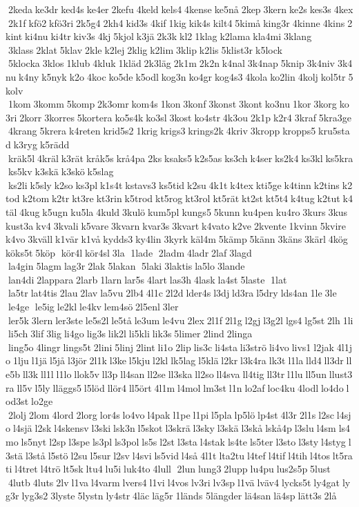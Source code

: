  2keda ke3dr ked4s ke4er 2kefu 4keld kels4 4kense ke5nå 2kep 3kern ke2s kes3s 4kex 2k1f kfö2 kfö3ri 2k5g4 2kh4 kid3s 4kif 1kig kik4s kilt4 5kimå king3r 4kinne 4kins 2kint ki4nu ki4tr kiv3s 4kj 5kjol k3jä 2k3k kl2 1klag k2lama kla4mi 3klang  3klass 2klat 5klav 2kle k2lej 2klig k2lim 3klip k2lis 5klist3r k5lock  5klocka 3klos 1klub 4kluk 1kläd 2k3läg 2k1m 2k2n k4nal 3k4nap 5knip 3k4niv 3k4nu k4ny k5nyk k2o 4koc ko5de k5odl kog3n ko4gr kog4s3 4kola ko2lin 4kolj kol5tr 5kolv  1kom 3komm 5komp 2k3omr kom4s 1kon 3konf 3konst 3kont ko3nu 1kor 3korg ko3ri 2korr 3korres 5kortera ko5s4k ko3sl 3kost ko4str 4k3ou 2k1p k2r4 3kraf 5kra3ge 4krang 5krera k4reten krid5s2 1krig krigs3 krings2k 4kriv 3kropp kropps5 kru5stad k3ryg k5rädd  kräk5l 4kräl k3rät kråk5s krå4pa 2ks ksaks5 k2s5as ks3ch k4ser ks2k4 ks3kl ks5kra ks5kv k3skä k3skö k5slag  ks2li k5sly k2so ks3pl k1s4t kstavs3 ks5tid k2su 4k1t k4tex kti5ge k4tinn k2tins k2tod k2tom k2tr kt3re kt3rin k5trod kt5rog kt3rol kt5rät kt2st kt5t4 k4tug k2tut k4täl 4kug k5ugn ku5la 4kuld 3kulö kum5pl kungs5 5kunn ku4pen ku4ro 3kurs 3kus kust3a kv4 3kvali k5vare 3kvarn kvar3s 3kvart k4vato k2ve 2kvente 1kvinn 5kvire k4vo 3kväll k1vär k1vå kydds3 ky4lin 3kyrk käl4m 5kämp 5känn 3käns 3kärl 4kög köks5t 5köp  kör4l kör4sl 3la  1lade  2ladm 4ladr 2laf 3lagd  la4gin 5lagm lag3r 2lak 5lakan  5laki 3laktis la5lo 3lande  lan4di 2lappara 2larb 1larn lar5s 4lart las3h 4lask la4st 5laste  1lat  la5tr lat4tis 2lau 2lav la5vu 2lb4 4l1c 2l2d lder4s l3dj ld3ra l5dry lds4an 1le 3le  le4ge  le5ig le2kl le4kv lem4sö 2l5enl 3ler  ler5k 3lern ler3ste le5s2l le5tå le3um le4vu 2lex 2l1f 2l1g l2gj l3g2l lgs4 lg5st 2lh 1li li5ch 3lif 3lig li4go lig3s lik2l li5kli lik3s 5limer 2lind 2linga  ling5o 4lingr lings5t 2lini 5linj 2lint li1o 2lip lis3c li4sta li3strö li4vo livs1 l2jak 4l1jo 1lju l1jä l5jå l3jör 2l1k l3ke l5kju l2kl lk5lag l5klä l2kr l3k4ra lk3t l1la lld4 ll3dr lle5b ll3k ll1l l1lo llok5v ll3p ll4san ll2se ll3ska ll2so ll4sva ll4tig ll3tr l1lu ll5un llust3ra ll5v l5ly lläggs5 l5löd llör4 ll5ört 4l1m l4mol lm3st l1n lo2af loc4ku 4lodl lo4do lod3st lo2ge  2lolj 2lom 4lord 2lorg lor4s lo4vo l4pak l1pe l1pi l5pla lp5lö lp4st 4l3r 2l1s l2sc l4sjo l4sjä l2sk l4skensv l3ski lsk3n l5skot l3skrä l3sky l3skä l3skå lskå4p l3slu l4sm ls4mo ls5nyt l2sp l3spe ls3pl ls3pol ls5s l2st l3sta l4stak ls4te ls5ter l3sto l3sty l4styg l3stä l3stå l5stö l2su l5sur l2sv l4svi ls5vid l4så 4l1t lta2tu l4tef l4tif l4tih l4tos lt5rati l4tret l4trö lt5sk ltu4 lu5i luk4to 4lull  2lun lung3 2lupp lu4pu lus2s5p 5lust  4lutb 4luts 2lv l1va l4varm lvers4 l1vi l4vos lv3ri lv3sp l1vä lväv4 lycks5t ly4gat lyg3r lyg3s2 3lyste 5lystn ly4str 4läc läg5r 1länds 	5längder lä4san lä4sp lätt3s 2lå 